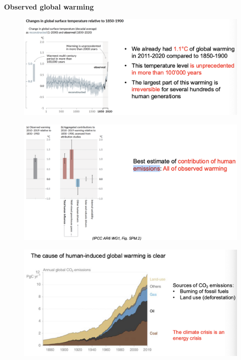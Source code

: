 \documentclass[fontsize=8pt, a4paper, landscape, fleqn]{scrartcl}
\renewcommand{\subsection}[1]{%
    \noindent\colorbox{subsectioncolor}{%
        \parbox{\dimexpr\columnwidth-2\fboxsep}{\color{white}\textbf{#1}}}%
    \vspace{0.5mm}%
}
\begin{document}
\begin{multicols*}{3}[\raggedcolumns]
\subsection{Observed global warming}
\begin{figure}[H]
    \centering
    \includegraphics[width=1\linewidth]{CS//img/Observed_global_warming.png}
\end{figure}
\begin{figure}[H]
    \centering
    \includegraphics[width=1\linewidth]{CS//img/Observed_gw_2.png}
\end{figure}

\begin{figure}[H]
    \centering
    \includegraphics[width=0.9\linewidth]{CS//img/CO2_concentation.png}
\end{figure}


\end{multicols*}
\end{document}
